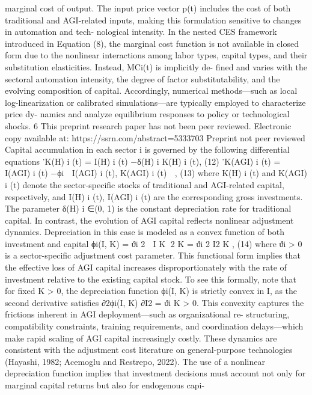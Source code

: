 marginal cost of output. The input price vector p(t) includes the cost of both traditional and
AGI-related inputs, making this formulation sensitive to changes in automation and tech-
nological intensity. In the nested CES framework introduced in Equation (8), the marginal
cost function is not available in closed form due to the nonlinear interactions among labor
types, capital types, and their substitution elasticities. Instead, MCi(t) is implicitly de-
fined and varies with the sectoral automation intensity, the degree of factor substitutability,
and the evolving composition of capital. Accordingly, numerical methods—such as local
log-linearization or calibrated simulations—are typically employed to characterize price dy-
namics and analyze equilibrium responses to policy or technological shocks.
6
This preprint research paper has not been peer reviewed. Electronic copy available at: https://ssrn.com/abstract=5333703
Preprint not peer reviewed
Capital accumulation in each sector i is governed by the following differential equations
˙K(H)
i
(t) = I(H)
i
(t) −δ(H)
i
K(H)
i
(t),
(12)
˙K(AGI)
i
(t) = I(AGI)
i
(t) −ϕi

I(AGI)
i
(t), K(AGI)
i
(t)

,
(13)
where K(H)
i
(t) and K(AGI)
i
(t) denote the sector-specific stocks of traditional and AGI-related
capital, respectively, and I(H)
i
(t), I(AGI)
i
(t) are the corresponding gross investments. The
parameter δ(H)
i
∈(0, 1) is the constant depreciation rate for traditional capital. In contrast,
the evolution of AGI capital reflects nonlinear adjustment dynamics. Depreciation in this
case is modeled as a convex function of both investment and capital
ϕi(I, K) = ϑi
2
 I
K
2
K = ϑi
2
I2
K ,
(14)
where ϑi > 0 is a sector-specific adjustment cost parameter. This functional form implies
that the effective loss of AGI capital increases disproportionately with the rate of investment
relative to the existing capital stock. To see this formally, note that for fixed K > 0, the
depreciation function ϕi(I, K) is strictly convex in I, as the second derivative satisfies
∂2ϕi(I, K)
∂I2
= ϑi
K > 0.
This convexity captures the frictions inherent in AGI deployment—such as organizational re-
structuring, compatibility constraints, training requirements, and coordination delays—which
make rapid scaling of AGI capital increasingly costly. These dynamics are consistent with
the adjustment cost literature on general-purpose technologies (Hayashi, 1982; Acemoglu
and Restrepo, 2022). The use of a nonlinear depreciation function implies that investment
decisions must account not only for marginal capital returns but also for endogenous capi-
